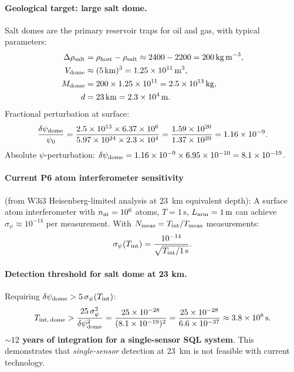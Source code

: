 \documentclass[aps,prd,twocolumn,superscriptaddress,nofootinbib]{revtex4-2}
\newcommand{\drho}{\Delta\rho}
\newcommand{\km}{\,\mathrm{km}}
\begin{document}
\paragraph{Geological target: large salt dome.}
Salt domes are the primary reservoir traps for oil and gas, with typical
parameters:
\begin{align}
  \drho_{\rm salt} &= \rho_{\rm host} - \rho_{\rm salt}
  \approx 2400 - 2200 = 200\,\mathrm{kg\,m}^{-3}, \\
  V_{\rm dome} &\approx (5\km)^3 = 1.25\times10^{11}\,\mathrm{m}^3, \\
  M_{\rm dome} &= 200\times1.25\times10^{11} = 2.5\times10^{13}\,\mathrm{kg}, \\
  d &= 23\km = 2.3\times10^4\,\mathrm{m}.
\end{align}
Fractional perturbation at surface:
\begin{equation}
  \frac{\delta\psi_{\rm dome}}{\psi_0}
  = \frac{2.5\times10^{13}\times6.37\times10^6}
  {5.97\times10^{24}\times2.3\times10^4}
  = \frac{1.59\times10^{20}}{1.37\times10^{29}}
  = 1.16\times10^{-9}.
  \label{eq:salt-dome-signal}
\end{equation}
Absolute $\psi$-perturbation:
$\delta\psi_{\rm dome} = 1.16\times10^{-9} \times 6.95\times10^{-10}
= 8.1\times10^{-19}$.

\paragraph{Current P6 atom interferometer sensitivity}
(from W3i3 Heisenberg-limited analysis at 23~km equivalent depth):
A surface atom interferometer with $n_{\rm at} = 10^6$ atoms,
$T = 1\,\mathrm{s}$, $L_{\rm arm} = 1\,\mathrm{m}$ can achieve
$\sigma_\psi \approx 10^{-14}$ per measurement.
With $N_{\rm meas} = T_{\rm int}/T_{\rm meas}$ measurements:
\begin{equation}
  \sigma_\psi(T_{\rm int}) = \frac{10^{-14}}{\sqrt{T_{\rm int}/1\,\mathrm{s}}}.
  \label{eq:sensor-sensitivity}
\end{equation}

\paragraph{Detection threshold for salt dome at 23 km.}
Requiring $\delta\psi_{\rm dome} > 5\,\sigma_\psi(T_{\rm int})$:
\begin{equation}
  T_{\rm int,\,dome} > \frac{25\,\sigma_\psi^2}{\delta\psi_{\rm dome}^2}
  = \frac{25\times10^{-28}}{(8.1\times10^{-19})^2}
  = \frac{25\times10^{-28}}{6.6\times10^{-37}}
  \approx 3.8\times10^8\,\mathrm{s}.
  \label{eq:salt-dome-int-time}
\end{equation}
\textbf{$\sim 12$ years of integration for a single-sensor SQL system}.
This demonstrates that \emph{single-sensor} detection at 23~km is
not feasible with current technology.
\end{document}
